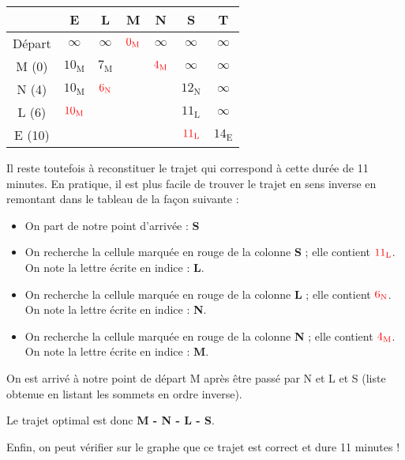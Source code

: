 \begin{center}
     \begin{extern}
          \begin{tabularx}{0.9\linewidth}{|c|C|C|C|C|C|C|}
               \hline
               \			&  E 						& L							& M							& N 							& S								& T  						\\ \hline
               Départ			&  $\infty$	 				& $\infty$					& $\color{red}0_{\text{M}}$	& $\infty$					& $\infty$						& $\infty$	  				\\ \hline
               M (0) 			&  $10_{\text{M}}$	 		& $7_{\text{M}}$	 			& 		& $\color{red}4_{\text{M}}$	& $\infty$						& $\infty$ 					\\ \hline
               N (4)			&  $10_{\text{M}}$	 		& $\color{red}6_{\text{N}}$	& \cellcolor{black!20}		& 		& $12_{\text{N}}$				& $\infty$ 					\\ \hline
               L (6)			&  $\color{red}10_{\text{M}}$	& 		& \cellcolor{black!20}		& 		& $11_{\text{L}}$				& $\infty$ 					\\ \hline
               E (10)			&  		& 		& \cellcolor{black!20}		& 		& $\color{red}11_{\text{L}}$		& $14_{\text{E}}$	 		\\ \hline
          \end{tabularx}
     \end{extern}
\end{center}
Il reste toutefois à reconstituer le trajet qui correspond à cette durée de 11 minutes.
En pratique, il est plus facile de trouver le trajet en sens inverse en \og remontant \fg{} dans le tableau de la façon suivante :
\begin{itemize}
     \item On part de notre point d'arrivée : \textbf{S}
     \item On recherche la cellule marquée en rouge de la colonne \textbf{S} ; elle contient $\color{red}{11_{\text{L}}}$. On note la lettre écrite en indice : \textbf{L}.
     \item On recherche la cellule marquée en rouge de la colonne \textbf{L} ; elle contient $\color{red}{6_{\text{N}}}$. On note la lettre écrite en indice : \textbf{N}.
     \item On recherche la cellule marquée en rouge de la colonne \textbf{N} ; elle contient $\color{red}{4_{\text{M}}}$. On note la lettre écrite en indice : \textbf{M}.
\end{itemize}
On est arrivé à notre point de départ M après être passé par N et L et S (liste obtenue en listant les sommets en ordre inverse).
\par
Le trajet optimal est donc \textbf{M - N - L - S}.
\par
Enfin, on peut vérifier sur le graphe que ce trajet est correct et dure 11 minutes !
